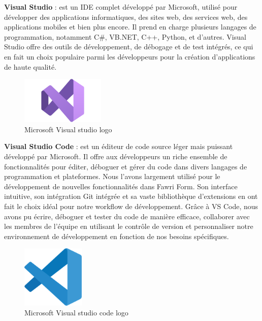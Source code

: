 \textbf{Visual Studio} : est un IDE complet développé par Microsoft, utilisé pour développer des applications informatiques, des sites web, des services web, des applications mobiles et bien plus encore. Il prend en charge plusieurs langages de programmation, notamment C\#, VB.NET, C++, Python, et d'autres. Visual Studio offre des outils de développement, de débogage et de test intégrés, ce qui en fait un choix populaire parmi les développeurs pour la création d'applications de haute qualité.
\\
\begin{figure}[H] 
    \centering
    \includegraphics[width=4cm]{Figures/Visual-Studio-logo.png}
        \caption{Microsoft Visual studio logo}
\end{figure}




\textbf{Visual Studio Code} : est un éditeur de code source léger mais puissant développé par Microsoft. Il offre aux développeurs un riche ensemble de fonctionnalités pour éditer, déboguer et gérer du code dans divers langages de programmation et plateformes. Nous l'avons largement utilisé pour le développement de nouvelles fonctionnalités dans Fawri Form. Son interface intuitive, son intégration Git intégrée et sa vaste bibliothèque d'extensions en ont fait le choix idéal pour notre workflow de développement. Grâce à VS Code, nous avons pu écrire, déboguer et tester du code de manière efficace, collaborer avec les membres de l'équipe en utilisant le contrôle de version et personnaliser notre environnement de développement en fonction de nos besoins spécifiques.
\\
\begin{figure}[H] 
    \centering
    \includegraphics[width=3cm]{Figures/vsclogo.png}
        \caption{Microsoft Visual studio code logo}
\end{figure}





